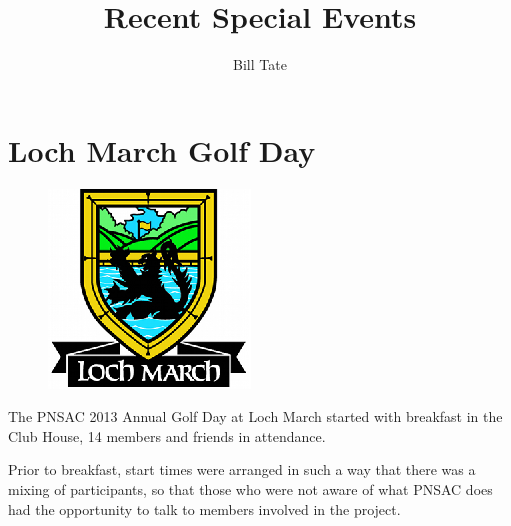 



\title{Recent Special Events}
\author{Bill Tate}

\maketitle


\section{Loch March Golf Day}
\label{golf}

\begin{figure}[htbp]
   \vspace{2em}
   \centering
   \includegraphics[scale=1.5]{loch_march.eps}
   \label{fig:logo}
\end{figure}

The PNSAC 2013 Annual Golf Day at Loch March started with breakfast in
the Club House, 14 members and friends in attendance.

Prior to breakfast, start times were arranged in such a way that there
was a mixing of participants, so that those who were not aware of what
PNSAC does had the opportunity to talk to members involved in the
project.

